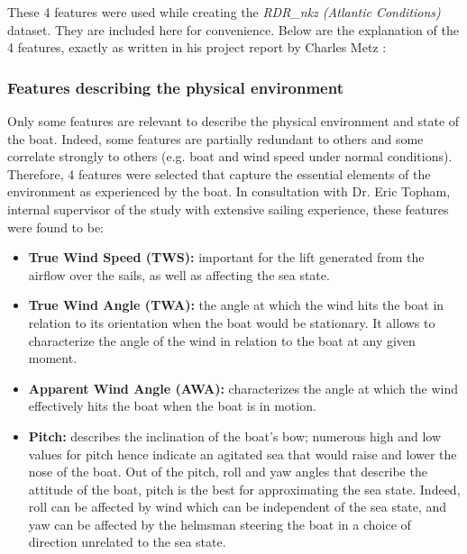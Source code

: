 These 4 features were used while creating the \textit{RDR\_nkz (Atlantic Conditions)} dataset. They are included here for convenience. Below are the explanation of the 4 features, exactly as written in his project report by Charles Metz \cite{charles}:

\subsubsection{Features describing the physical environment} 
Only some features are relevant to describe the physical environment and state of the boat. Indeed, some features are partially redundant to others and some correlate strongly to others (e.g. boat and wind speed under normal conditions). Therefore, 4 features were selected that capture the essential elements of the environment as experienced by the boat. In consultation with Dr. Eric Topham, internal supervisor of the study with extensive sailing experience, these features were found to be: 

\begin{itemize}
    \item \textbf{True Wind Speed (TWS):} important for the lift generated from the airflow over the sails, as well as affecting the sea state.
    \item \textbf{True Wind Angle (TWA):} the angle at which the wind hits the boat in relation to its orientation when the boat would be stationary. It allows to characterize the angle of the wind in relation to the boat at any given moment.
    \item \textbf{Apparent Wind Angle (AWA):} characterizes the angle at which the wind effectively hits the boat when the boat is in motion.
    \item \textbf{Pitch:} describes the inclination of the boat’s bow; numerous high and low values for pitch hence indicate an agitated sea that would raise and lower the nose of the boat. Out of the pitch, roll and yaw angles that describe the attitude of the boat, pitch is the best for approximating the sea state. Indeed, roll can be affected by wind which can be independent of the sea state, and yaw can be affected by the helmsman steering the boat in a choice of direction unrelated to the sea state.
\end{itemize}